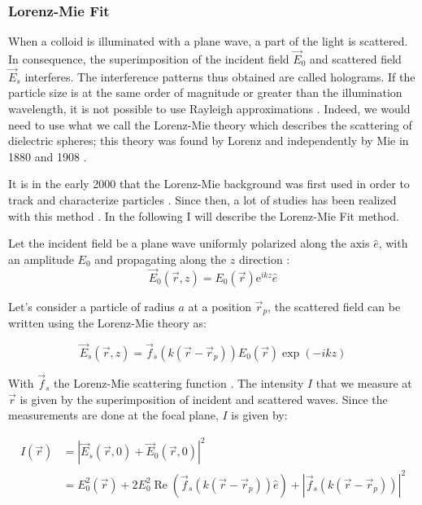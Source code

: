 \subsubsection{Lorenz-Mie Fit}
\label{chap:LM_fit}

When a colloid is illuminated with a plane wave, a part of the light is scattered. In consequence, the superimposition of the incident field $\vec{E}_0$ and scattered field $\vec{E}_s$ interferes. The interference patterns thus obtained are called holograms. If the particle size is at the same order of magnitude or greater than the illumination wavelength, it is not possible to use Rayleigh approximations \cite{strutt_lviii_1871}. Indeed, we would need to use what we call  the Lorenz-Mie theory which describes the scattering of dielectric spheres; this theory was found by Lorenz and independently by Mie in 1880 and 1908 \cite{lorenz_lysbevaegelsen_1890, mie_beitrage_1908}. 

It is in the early 2000 that the Lorenz-Mie background was first used in order to track and characterize particles \cite{ovryn_imaging_2000, lee_characterizing_2007}. Since then, a lot of studies has been realized with this method \cite{katz_applications_2010}. In the following I will describe the Lorenz-Mie Fit method.

Let the incident field be a plane wave uniformly polarized along the axis $ \hat{e}$, with an amplitude $E_0$ and propagating along the $z$ direction :
\begin{equation}
	\vec{E}_0(\vec{r},z) = E_0(\vec{r}) \mathrm{e}^{ikz}\hat{e}
\end{equation}

Let's consider a particle of radius $a$ at a position $\vec{r}_p $, the scattered field can be written using the Lorenz-Mie theory \cite{f_bohren_absorption_1998} as:

\begin{equation}
	\vec{E}_s(\vec{r}, z) =  \vec{f}_s(k(\vec{r} - \vec{r}_p))E_0(\vec{r}) \exp \left(-ikz\right) 
\end{equation} 

With $\vec{f}_s$ the Lorenz-Mie scattering function \cite{f_bohren_absorption_1998}. The intensity $I$ that we measure at $\vec{r}$ is given by the superimposition of incident and scattered waves. Since the measurements are done at the focal plane, $I$ is given by:

\begin{equation}
	\begin{aligned}
	I(\vec{r}) & = |\vec{E}_s(\vec{r}, 0) + \vec{E}_0(\vec{r}, 0)|^2 \\
	& = E_0^2(\vec{r}) + 2 E_0^2\operatorname{Re} \left(\vec{f}_s(k(\vec{r}- \vec{r}_p)) \hat{e}\right) + | \vec{f}_s(k(\vec{r}- \vec{r}_p)) |^2
	\end{aligned}
\end{equation}


